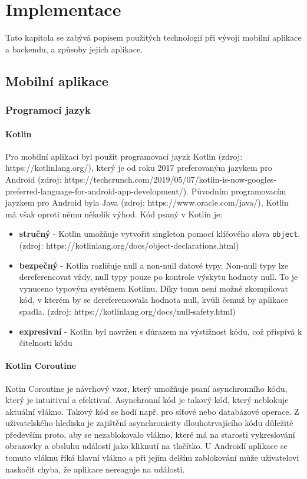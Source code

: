 \chapter{Implementace}
\setcounter{page}{1}

Tato kapitola se zabývá popisem použitých technologií při vývoji mobilní aplikace a backendu,
a způsoby jejich aplikace.

\section{Mobilní aplikace}

\subsection{Programocí jazyk}

\subsubsection *{Kotlin}
Pro mobilní aplikaci byl použit programovací jayzk Kotlin (zdroj: https://kotlinlang.org/), který je od roku 2017 preferovaným jazykem pro Android (zdroj: https://techcrunch.com/2019/05/07/kotlin-is-now-googles-preferred-language-for-android-app-development/). Původním programovacím jayzkem pro Android byla Java (zdroj: https://www.oracle.com/java/), Kotlin má však oproti němu několik výhod. Kód psaný v Kotlin je:

\begin{itemize}
    \item \textbf{stručný} - Kotlin umožňuje vytvořit 
    singleton pomocí klíčového slova \lstinline{object}. (zdroj: https://kotlinlang.org/docs/object-declarations.html)
    \item \textbf{bezpečný} - Kotlin rozlišuje null a non-null datové typy. Non-null typy lze dereferencovat vždy, null typy pouze po kontrole výskytu hodnoty null. To je vynuceno typovým systémem Kotlinu. Díky tomu není možné zkompilovat kód, v kterém by se dereferencovala hodnota null, kvůli čemuž by aplikace spadla. (zdroj: https://kotlinlang.org/docs/null-safety.html)
    \item \textbf{expresivní} - Kotlin byl navržen s důrazem na výstižnost kódu, což přispívá k čitelnosti kódu
\end{itemize}

\subsubsection *{Kotlin Coroutine}
Kotin Coroutine je návrhový vzor, který umožňuje psaní asynchronního kódu, který je intuitivní a efektivní. Asynchronní kód je takový kód, který neblokuje aktuální vlákno. Takový kód se hodí např. pro síťové nebo databázové operace. Z uživatelského hlediska je zajištění asynchronicity dlouhotrvajícího kódu důležité především proto, aby se nezablokovalo vlákno, které má na starosti vykreslování obrazovky a obsluhu událostí jako kliknutí na tlačítko. U Androidí aplikace se tomuto vláknu říká hlavní vlákno a při jejím delším zablokování může uživatelovi naskočit chyba, že aplikace nereaguje na události.

